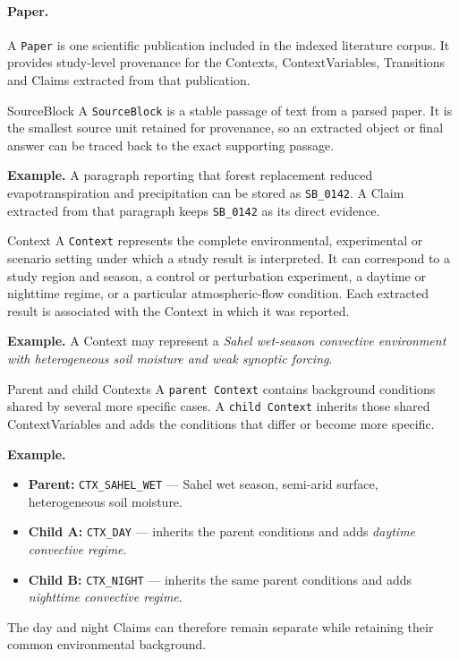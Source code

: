 \documentclass[10pt,twocolumn]{article}
\begin{document}
\paragraph{Paper.}
A \texttt{Paper} is one scientific publication included in the indexed literature corpus. It provides study-level provenance for the Contexts, ContextVariables, Transitions and Claims extracted from that publication.

\begin{definitionbox}{SourceBlock}
A \texttt{SourceBlock} is a stable passage of text from a parsed paper. It is the smallest source unit retained for provenance, so an extracted object or final answer can be traced back to the exact supporting passage.

\textbf{Example.} A paragraph reporting that forest replacement reduced evapotranspiration and precipitation can be stored as \texttt{SB\_0142}. A Claim extracted from that paragraph keeps \texttt{SB\_0142} as its direct evidence.
\end{definitionbox}

\begin{definitionbox}{Context}
A \texttt{Context} represents the complete environmental, experimental or scenario setting under which a study result is interpreted. It can correspond to a study region and season, a control or perturbation experiment, a daytime or nighttime regime, or a particular atmospheric-flow condition. Each extracted result is associated with the Context in which it was reported.

\textbf{Example.} A Context may represent a \emph{Sahel wet-season convective environment with heterogeneous soil moisture and weak synoptic forcing}.

\begin{subdefinitionbox}{Parent and child Contexts}
A \texttt{parent Context} contains background conditions shared by several more specific cases. A \texttt{child Context} inherits those shared ContextVariables and adds the conditions that differ or become more specific.

\textbf{Example.}
\begin{itemize}
  \item \textbf{Parent:} \texttt{CTX\_SAHEL\_WET} --- Sahel wet season, semi-arid surface, heterogeneous soil moisture.
  \item \textbf{Child A:} \texttt{CTX\_DAY} --- inherits the parent conditions and adds \emph{daytime convective regime}.
  \item \textbf{Child B:} \texttt{CTX\_NIGHT} --- inherits the same parent conditions and adds \emph{nighttime convective regime}.
\end{itemize}
The day and night Claims can therefore remain separate while retaining their common environmental background.
\end{subdefinitionbox}
\end{definitionbox}
\end{document}
